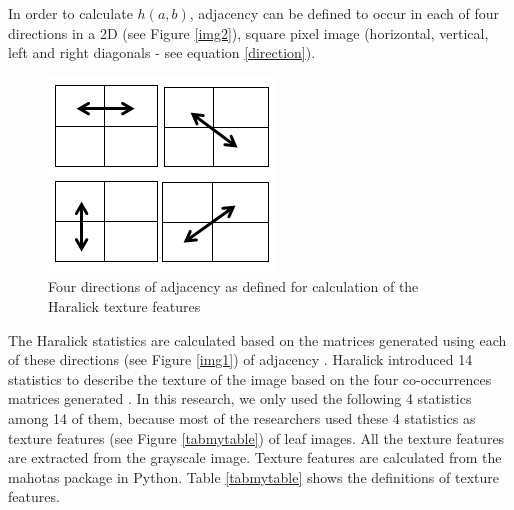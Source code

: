 \documentclass{article}
\begin{document}
In order to calculate \(h(a,b)\), adjacency can be defined to
occur in each of four directions in a 2D (see Figure \ref{img2}), square
pixel image (horizontal, vertical, left and right diagonals - see
equation \ref{direction}).

\begin{figure}[!ht]

{\centering \includegraphics[width=0.2\linewidth]{leaffeatures/GLMC_direction.png} 

}

\caption{\label{direction}Four directions of adjacency as defined for calculation of the Haralick texture features}\label{fig:unnamed-chunk-9}
\end{figure}

The Haralick statistics are calculated based on the
matrices generated using each of these directions (see Figure
\ref{img1}) of adjacency . Haralick introduced 14 statistics to describe
the texture of the image based on the four co-occurrences matrices
generated \citep{article31}. In this research, we only used the following 4 statistics
among 14 of them, because most of the researchers used these 4
statistics as texture features (see Figure \ref{tabmytable}) of leaf
images. All the texture features are extracted from the grayscale
image. Texture features are calculated from the mahotas package in
Python. Table \ref{tabmytable} shows the definitions of texture
features.
\end{document}
